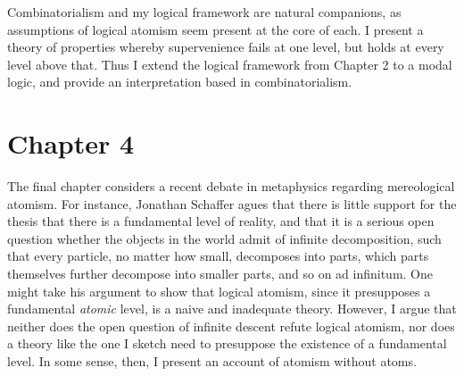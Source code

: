 \documentclass[12pt]{article}
\begin{document}
Combinatorialism and my logical framework are natural companions, as assumptions of logical atomism seem present at the core of each. I present a theory of properties whereby supervenience fails at one level, but holds at every level above that. Thus I extend the logical framework from Chapter 2 to a modal logic, and provide an interpretation based in combinatorialism.
\section*{Chapter 4}
The final chapter considers a recent debate in metaphysics regarding mereological atomism. For instance, Jonathan Schaffer agues that there is little support for the thesis that there is a fundamental level of reality, and that it is a serious open question whether the objects in the world admit of infinite decomposition, such that every particle, no matter how small, decomposes into parts, which parts themselves further decompose into smaller parts, and so on ad infinitum. One might take his argument to show that logical atomism, since it presupposes a fundamental \emph{atomic} level, is a naive and inadequate theory. However, I argue that neither does the open question of infinite descent refute logical atomism, nor does a theory like the one I sketch need to presuppose the existence of a fundamental level. In some sense, then, I present an account of atomism without atoms.
\nocite{*}


\end{document}
